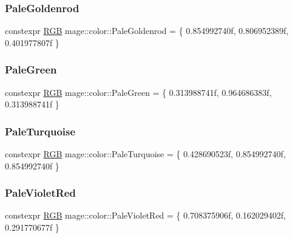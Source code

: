 \hypertarget{namespacemage_1_1color_a504a28b76da12e65cc57019bc2481b6f}{}\label{namespacemage_1_1color_a504a28b76da12e65cc57019bc2481b6f} 
\subsubsection{\texorpdfstring{Pale\+Goldenrod}{PaleGoldenrod}}
{\footnotesize\ttfamily constexpr \hyperlink{structmage_1_1_r_g_b}{R\+GB} mage\+::color\+::\+Pale\+Goldenrod = \{ 0.\+854992740f, 0.\+806952389f, 0.\+401977807f \}}

\hypertarget{namespacemage_1_1color_a1e055d7a69c5f8f9ffdac938889e306a}{}\label{namespacemage_1_1color_a1e055d7a69c5f8f9ffdac938889e306a} 
\subsubsection{\texorpdfstring{Pale\+Green}{PaleGreen}}
{\footnotesize\ttfamily constexpr \hyperlink{structmage_1_1_r_g_b}{R\+GB} mage\+::color\+::\+Pale\+Green = \{ 0.\+313988741f, 0.\+964686383f, 0.\+313988741f \}}

\hypertarget{namespacemage_1_1color_ad6ef41327e0e1d862f7b95324e93b4a1}{}\label{namespacemage_1_1color_ad6ef41327e0e1d862f7b95324e93b4a1} 
\subsubsection{\texorpdfstring{Pale\+Turquoise}{PaleTurquoise}}
{\footnotesize\ttfamily constexpr \hyperlink{structmage_1_1_r_g_b}{R\+GB} mage\+::color\+::\+Pale\+Turquoise = \{ 0.\+428690523f, 0.\+854992740f, 0.\+854992740f \}}

\hypertarget{namespacemage_1_1color_a86d236f89e45680e1678c6d1e9a287bc}{}\label{namespacemage_1_1color_a86d236f89e45680e1678c6d1e9a287bc} 
\subsubsection{\texorpdfstring{Pale\+Violet\+Red}{PaleVioletRed}}
{\footnotesize\ttfamily constexpr \hyperlink{structmage_1_1_r_g_b}{R\+GB} mage\+::color\+::\+Pale\+Violet\+Red = \{ 0.\+708375906f, 0.\+162029402f, 0.\+291770677f \}}

